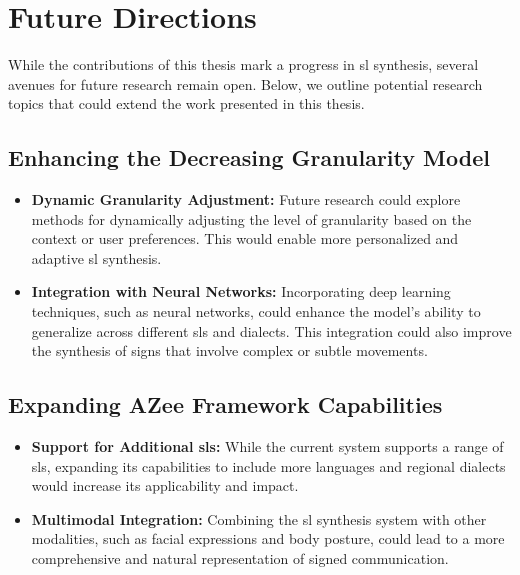 \documentclass[../../main.tex]{subfiles}
\begin{document}
\section{Future Directions}
\label{ch:conclusion:future}

While the contributions of this thesis mark a progress in \gls{sl} synthesis, several avenues for future research remain open. Below, we outline potential research topics that could extend the work presented in this thesis.

\subsection{Enhancing the Decreasing Granularity Model}
\label{ch:conclusion:future:granularity}

\begin{itemize}
    \item \textbf{Dynamic Granularity Adjustment:} Future research could explore methods for dynamically adjusting the level of granularity based on the context or user preferences. This would enable more personalized and adaptive \gls{sl} synthesis.
    
    \item \textbf{Integration with Neural Networks:} Incorporating deep learning techniques, such as neural networks, could enhance the model’s ability to generalize across different \gls{sl}s and dialects. This integration could also improve the synthesis of signs that involve complex or subtle movements.
\end{itemize}

\subsection{Expanding AZee Framework Capabilities}
\label{ch:conclusion:future:azee}

\begin{itemize}
    \item \textbf{Support for Additional \gls{sl}s:} While the current system supports a range of \gls{sl}s, expanding its capabilities to include more languages and regional dialects would increase its applicability and impact.
    
    \item \textbf{Multimodal Integration:} Combining the \gls{sl} synthesis system with other modalities, such as facial expressions and body posture, could lead to a more comprehensive and natural representation of signed communication.
\end{itemize}
\end{document}
